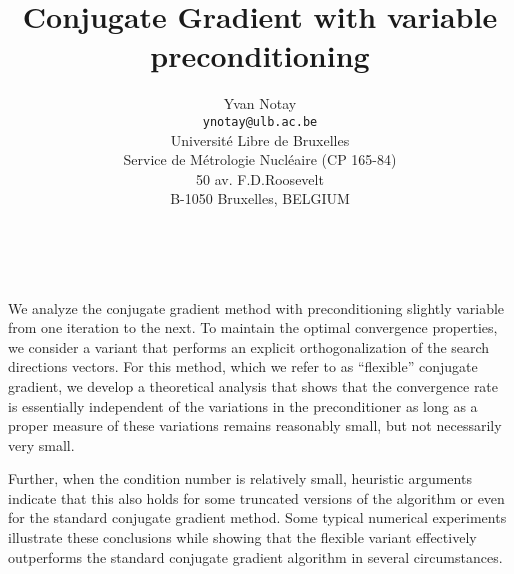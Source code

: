 \documentclass[11pt]{article}
\date{ ~ \hspace{-4mm}}
\title{Conjugate Gradient with  variable preconditioning  }
\author{Yvan Notay \\ {\tt  ynotay@ulb.ac.be} \\ Universit\'{e} Libre de Bruxelles \\ Service de M\'{e}trologie Nucl\'{e}aire (CP 165-84) \\ 50 av. F.D.Roosevelt \\ B-1050 Bruxelles, BELGIUM}
\begin{document}
\maketitle
\thispagestyle{empty}





 



We analyze the conjugate gradient  method with 
preconditioning
slightly variable from one iteration to the next.
To maintain the optimal convergence properties, we
consider a variant that performs an explicit
orthogonalization of the search directions vectors.
For this method,
which we refer to as  ``flexible'' conjugate gradient, 
we develop a
theoretical analysis that shows that the convergence 
rate is essentially independent of the variations in 
the preconditioner as long as a proper
measure of these variations remains reasonably small,
but not necessarily very small.

Further, when the condition number is
relatively small, heuristic arguments indicate that this
also holds for some truncated versions of the algorithm 
or even for the standard conjugate gradient method. 
Some typical numerical experiments illustrate these
conclusions while showing that the flexible 
variant effectively outperforms the
standard conjugate gradient algorithm in several 
circumstances.
\end{document}
